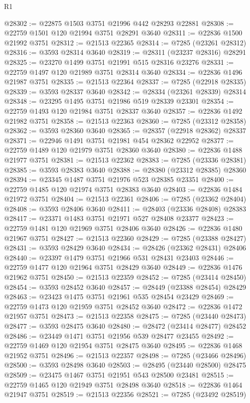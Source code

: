 \begin{lexlean}{R1}
\begin{coremodule}
@28302 := @22875 @1503 @3751 @21996 @442 @28293 @22881
@28308 := @22759 @1501 @120 @21994 @3751 @28291 @3640
@28311 := @22836 @1500 @21992 @3751
@28312 := @21513 @22365
@28314 := @7285 (@23261 @28312)
@28316 := @3593 @28314 @3640
@28319 := @28311 (@23237 @28316) @28291
@28325 := @23270 @1499 @3751 @21991 @515 @28316 @23276
@28331 := @22759 @1497 @120 @21989 @3751 @28314 @3640
@28334 := @22836 @1496 @21987 @3751
@28335 := @21513 @22364
@28337 := @7285 (@22918 @28335)
@28339 := @3593 @28337 @3640
@28342 := @28334 (@23261 @28339) @28314
@28348 := @23295 @1495 @3751 @21986 @519 @28339 @23301
@28354 := @22759 @1493 @120 @21984 @3751 @28337 @3640
@28357 := @22836 @1492 @21982 @3751
@28358 := @21513 @22363
@28360 := @7285 (@23312 @28358)
@28362 := @3593 @28360 @3640
@28365 := @28357 (@22918 @28362) @28337
@28371 := @22946 @1491 @3751 @21981 @454 @28362 @22952
@28377 := @22759 @1489 @120 @21979 @3751 @28360 @3640
@28380 := @22836 @1488 @21977 @3751
@28381 := @21513 @22362
@28383 := @7285 (@23336 @28381)
@28385 := @3593 @28383 @3640
@28388 := @28380 (@23312 @28385) @28360
@28394 := @23345 @1487 @3751 @21976 @523 @28385 @23351
@28400 := @22759 @1485 @120 @21974 @3751 @28383 @3640
@28403 := @22836 @1484 @21972 @3751
@28404 := @21513 @22361
@28406 := @7285 (@23362 @28404)
@28408 := @3593 @28406 @3640
@28411 := @28403 (@23336 @28408) @28383
@28417 := @23371 @1483 @3751 @21971 @527 @28408 @23377
@28423 := @22759 @1481 @120 @21969 @3751 @28406 @3640
@28426 := @22836 @1480 @21967 @3751
@28427 := @21513 @22360
@28429 := @7285 (@23388 @28427)
@28431 := @3593 @28429 @3640
@28434 := @28426 (@23362 @28431) @28406
@28440 := @23397 @1479 @3751 @21966 @531 @28431 @23403
@28446 := @22759 @1477 @120 @21964 @3751 @28429 @3640
@28449 := @22836 @1476 @21962 @3751
@28450 := @21513 @22359
@28452 := @7285 (@23414 @28450)
@28454 := @3593 @28452 @3640
@28457 := @28449 (@23388 @28454) @28429
@28463 := @23423 @1475 @3751 @21961 @535 @28454 @23429
@28469 := @22759 @1473 @120 @21959 @3751 @28452 @3640
@28472 := @22836 @1472 @21957 @3751
@28473 := @21513 @22358
@28475 := @7285 (@23440 @28473)
@28477 := @3593 @28475 @3640
@28480 := @28472 (@23414 @28477) @28452
@28486 := @23449 @1471 @3751 @21956 @539 @28477 @23455
@28492 := @22759 @1469 @120 @21954 @3751 @28475 @3640
@28495 := @22836 @1468 @21952 @3751
@28496 := @21513 @22357
@28498 := @7285 (@23466 @28496)
@28500 := @3593 @28498 @3640
@28503 := @28495 (@23440 @28500) @28475
@28509 := @23475 @1467 @3751 @21951 @543 @28500 @23481
@28515 := @22759 @1465 @120 @21949 @3751 @28498 @3640
@28518 := @22836 @1464 @21947 @3751
@28519 := @21513 @22356
@28521 := @7285 (@23492 @28519)

\end{coremodule}
\end{lexlean}
